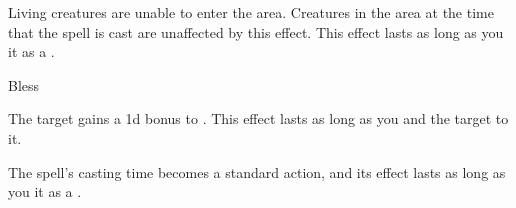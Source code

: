 \begin{spellcontent}
\begin{augmenttargetinginfo}
\end{augmenttargetinginfo}
\begin{augmenteffects}
\spelleffect
Living creatures are unable to enter the area.
Creatures in the area at the time that the spell is cast are unaffected by this effect.
This effect lasts as long as you  it as a .
\end{augmenteffects}
\end{spellcontent}
\begin{spellsection}{Bless}
\begin{spellheader}
\end{spellheader}
\begin{spellcontent}
\begin{spelltargetinginfo}
\end{spelltargetinginfo}
\begin{spelleffects}
\spelleffect
The target gains a \plus1d bonus to .
This effect lasts as long as you and the target  to it.
\end{spelleffects}
\end{spellcontent}
\begin{spellfooter}
\end{spellfooter}
\begin{spellsubcontent}
\begin{spellcantrip}
The spell's casting time becomes a standard action, and its effect lasts as long as you  it as a .
\end{spellcantrip}
\end{spellsubcontent}
\end{spellsection}

